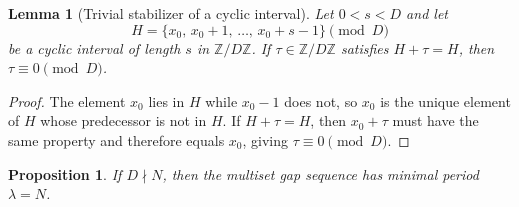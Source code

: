 \documentclass[11pt,reqno]{amsart}
\theoremstyle{plain}
\newtheorem{lemma}[theorem]{Lemma}
\newtheorem{proposition}[theorem]{Proposition}
\theoremstyle{definition}
\theoremstyle{remark}
\begin{document}
\begin{lemma}[Trivial stabilizer of a cyclic interval]
\label{lem:cyclic_interval_stabilizer}
Let \(0 < s < D\) and let
\[
    H = \{x_0,\, x_0+1,\, \ldots,\, x_0+s-1\} \pmod{D}
\]
be a cyclic interval of length \(s\) in \(\mathbb{Z}/D\mathbb{Z}\).
If \(\tau \in \mathbb{Z}/D\mathbb{Z}\) satisfies \(H + \tau = H\),
then \(\tau \equiv 0 \pmod{D}\).
\end{lemma}

\begin{proof}
The element \(x_0\) lies in \(H\) while \(x_0 - 1\) does not, so
\(x_0\) is the unique element of \(H\) whose predecessor is not in
\(H\).  If \(H + \tau = H\), then \(x_0 + \tau\) must have the same
property and therefore equals \(x_0\), giving
\(\tau \equiv 0 \pmod{D}\).
\end{proof}

\begin{proposition}\label{prop:generic_period}
If \(D \nmid N\), then the multiset gap sequence has minimal
period \(\lambda = N\).
\end{proposition}
\end{document}

